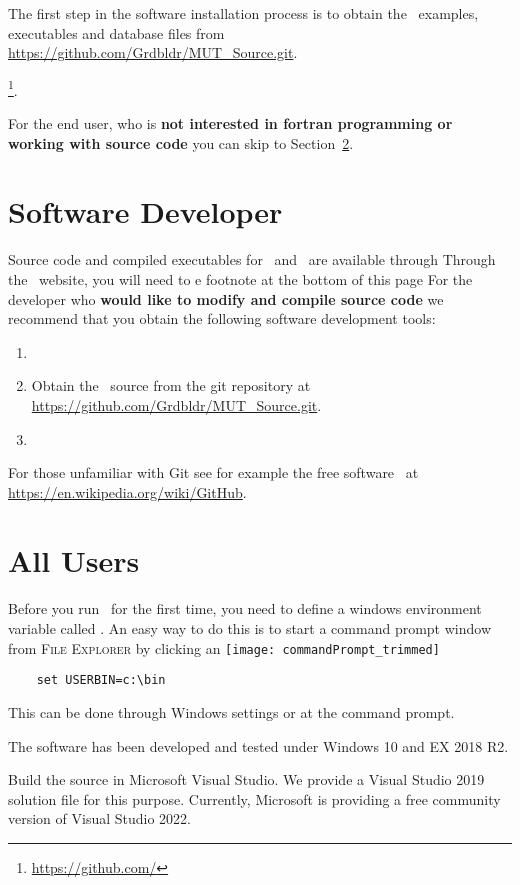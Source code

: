 \label{texfile:Installation}
The first step in the software installation process is to obtain the \mut\ examples, executables and database files from
\url{https://github.com/Grdbldr/MUT_Source.git}.  



\github\footnote{\url{https://github.com/} }. 


For the end user, who is \textbf{not interested in fortran programming or working with source code} you can skip to Section~\ref{section:allusers}.

\section{Software Developer}\label{section:softwareDev}
Source code and compiled executables for \mut\ and \mfu\ are available through   Through the \github\ website, you will need to e footnote at the bottom of this page
For the developer who \textbf{would like to modify and compile source code} we recommend that you obtain the following software development tools:
\begin{enumerate}
\item 
    \item Obtain the \mut\ source from the git repository at \url{https://github.com/Grdbldr/MUT_Source.git}.
    \item 
\end{enumerate}
For those unfamiliar with Git see for example the free software \github\ at \url{https://en.wikipedia.org/wiki/GitHub}.

\section{All Users}\label{section:allusers}


Before you run \mut\ for the first time, you need to define a windows environment variable called \bin.  An easy way to do this is to start a command prompt window from \textsc{File Explorer} by clicking an 
    \texttt{[image: commandPrompt\_trimmed]}

\begin{verbatim}
    set USERBIN=c:\bin
\end{verbatim}
This can be done through Windows settings or at the command prompt.

The software has been developed and tested under Windows 10 and  EX 2018 R2.


    Build the source in Microsoft Visual Studio.  We provide a Visual Studio 2019 solution file for this purpose. Currently, Microsoft is providing a free community version of Visual Studio 2022.
